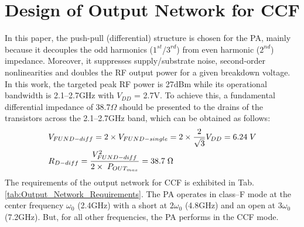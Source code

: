 \documentclass[conference]{IEEEtran}
\begin{document}
 

\section{Design of Output Network for CCF}
\label{section:ON}
In this paper, the push-pull (differential) structure is chosen for the PA, mainly because it decouples the odd harmonics ($1^{st}$/$3^{rd}$) from even harmonic ($2^{nd}$) impedance. Moreover, it suppresses supply/substrate noise, second-order nonlinearities and doubles the RF output power for a given breakdown voltage. 
In this work, the targeted peak RF power is 27dBm  while its operational bandwidth is 2.1--2.7GHz with $V_{DD}$ = 2.7V. To achieve this, a  fundamental differential impedance of 38.7$\Omega$ should be presented to the drains of the transistors across the 2.1--2.7GHz band, which can be obtained as follows:
\vspace{-0.05in}
\begin{equation}
\begin{aligned}
&V_{FUND-diff}=2\times V_{FUND-single}=2\times\frac{2}{\sqrt{3}} V_{DD}=6.24 \hspace{1mm}V\\
&R_{D-diff}=\frac{V_{FUND-diff}^{2}}{2\times\hspace{1mm} P_{OUT_{max}}}=38.7 \hspace{1mm} \Omega
\label{eqn_diff_imp}
\end{aligned}
\end{equation}
The requirements of the output network for CCF is exhibited in Tab. \ref{tab:Output_Network_Requirements}. The PA operates in class--F mode at the center frequency $\omega_0$ (2.4GHz) with a short at $2\omega_0$ (4.8GHz) and an open at $3\omega_0$ (7.2GHz). But, for all other frequencies, the PA performs in the CCF mode. 
\end{document}
